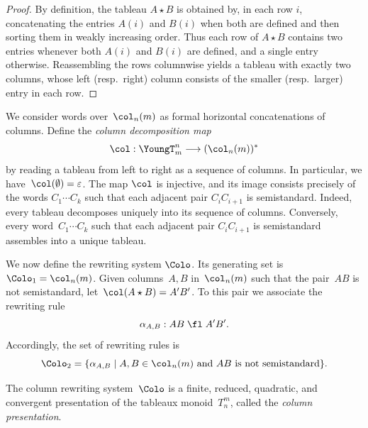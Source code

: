 \documentclass[a4paper, twoside, 11pt, english]{article}
\begin{document}
\begin{proof}
By definition, the tableau $A \star B$ is obtained by, in each row $i$,
concatenating the entries $A(i)$ and $B(i)$ when both are defined and then
sorting them in weakly increasing order.
Thus each row of $A \star B$ contains two entries whenever both $A(i)$ and
$B(i)$ are defined, and a single entry otherwise.
Reassembling the rows columnwise yields a tableau with exactly two columns,
whose left (resp.~right) column consists of the smaller (resp.~larger)
entry in each row.
\end{proof}

We consider words over~$\col_n(m)$ as formal horizontal concatenations of columns.
Define the \emph{column decomposition map}
\[
\col : \YoungT_m^n \longrightarrow (\col_n(m))^\ast
\]
by reading a tableau from left to right as a sequence of columns. In particular, we have~$\col(\emptyset)=\varepsilon$.
The map $\col$ is injective, and its image consists precisely of the
words $C_1\cdots C_k$ such that each adjacent pair $C_iC_{i+1}$ is
semistandard.
Indeed, every tableau decomposes uniquely into its sequence of columns.
Conversely, every word~$C_1\cdots C_k$ such that each adjacent pair
$C_iC_{i+1}$ is semistandard assembles into a unique tableau.

We now define the rewriting system $\Colo$.
Its generating set is~$\Colo_1=\col_n(m)$.
Given columns~$A,B$ in~$\col_n(m)$ such that the pair~$AB$ is not
semistandard, let~$\col(A\star B)=A'B'$.
To this pair we associate the rewriting rule
\[
\alpha_{A,B}: AB \;\fl\; A'B'.
\]
Accordingly, the set of rewriting rules is
\[
\Colo_2=
\{\alpha_{A,B}\mid A,B\in\col_n(m)\text{ and }AB\text{ is not semistandard}\}.
\]

\begin{theorem}
\label{thm:ColumnPresentation}
The column rewriting system~$\Colo$ is a finite, reduced, quadratic, and convergent
presentation of the tableaux monoid~$T_n^m$, called the \emph{column presentation}.
\end{theorem}
\end{document}

